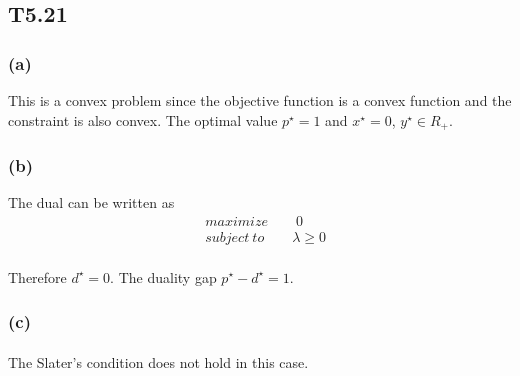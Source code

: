 \subsection*{T5.21}
\subsubsection*{(a)}
This is a convex problem since the objective function is a convex function and the constraint is also convex. The optimal value $p^{\star} = 1$ and $x^{\star} =0$, $y^{\star} \in R_+$.
\subsubsection*{(b)}
The dual can be written as 
\begin{align*}
&maximize \qquad 0\\
&subject\ to \qquad \lambda \geq 0
\end{align*}
\paragraph{}
Therefore $d^{\star} =0$. The duality gap $p^{\star}-d^{\star} =1$.
\subsubsection*{(c)}
\paragraph{}
The Slater's condition does not hold in this case.